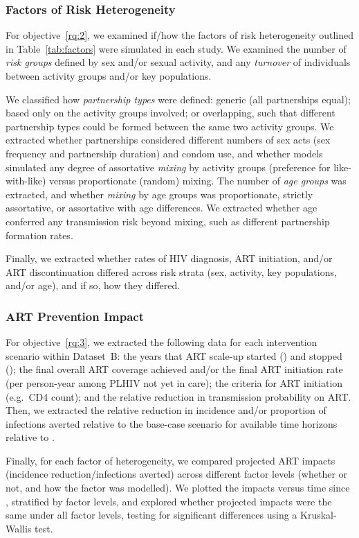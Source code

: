 \subsubsection{Factors of Risk Heterogeneity}
\label{sss:meth:factors}
For objective~\ref{rq:2}, we examined if/how
the factors of risk heterogeneity outlined in Table~\ref{tab:factors}
were simulated in each study.
We examined the number of \emph{risk groups} defined by sex and/or sexual activity, and
any \emph{turnover} of individuals between activity groups and/or key populations.
\par
We classified how \emph{partnership types} were defined:
generic (all partnerships equal);
based only on the activity groups involved;
or overlapping, such that different partnership types could be formed between the same two activity groups.
We extracted whether partnerships considered different
numbers of sex acts (sex frequency and partnership duration) and condom use,
and whether models simulated any degree of assortative \emph{mixing} by activity groups
(preference for like-with-like) versus proportionate (random) mixing.
The number of \emph{age groups} was extracted, and whether \emph{mixing} by age groups was
proportionate, strictly assortative, or assortative with age differences.
We extracted whether age conferred any transmission risk beyond mixing,
such as different partnership formation rates.
\par
Finally, we extracted whether rates of HIV diagnosis, ART initiation, and/or ART discontinuation
differed across risk strata (sex, activity, key populations, and/or age),
and if so, how they differed.
\subsubsection{ART Prevention Impact}
\label{sss:meth:api}
For objective~\ref{rq:3}, we extracted
the following data for each intervention scenario within Dataset~B:
the years that ART scale-up started () and stopped ();
the final overall ART coverage achieved and/or
the final ART initiation rate (per person-year among PLHIV not yet in care);
the criteria for ART initiation (e.g.\ CD4 count); and
the relative reduction in transmission probability on ART.
Then, we extracted the
relative reduction in incidence and/or proportion of infections averted
relative to the base-case scenario for available time horizons relative to .
\par
Finally, for each factor of heterogeneity,
we compared projected ART impacts (incidence reduction/infections averted)
across different factor levels (whether or not, and how the factor was modelled).
We plotted the impacts versus time since , stratified by factor levels,
and explored whether projected impacts were the same under all factor levels,
testing for significant differences using a Kruskal-Wallis test.